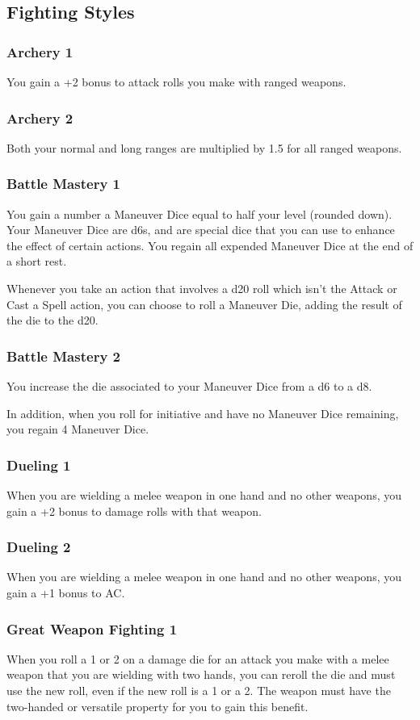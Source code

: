 \subsection*{Fighting Styles} \label{ssec::fightingstyles}
    \subsubsection{Archery 1}
        You gain a +2 bonus to attack rolls you make with ranged weapons.
    \subsubsection{Archery 2}
        Both your normal and long ranges are multiplied by 1.5 for all ranged weapons.
    \subsubsection{Battle Mastery 1}
        You gain a number a Maneuver Dice equal to half your level (rounded down).
        Your Maneuver Dice are d6s, and are special dice that you can use to enhance the effect of certain actions.
        You regain all expended Maneuver Dice at the end of a short rest.

        Whenever you take an action that involves a d20 roll which isn't the Attack or Cast a Spell action, you can choose to roll a Maneuver Die, adding the result of the die to the d20.
    \subsubsection{Battle Mastery 2}
        You increase the die associated to your Maneuver Dice from a d6 to a d8.

        In addition, when you roll for initiative and have no Maneuver Dice remaining, you regain 4 Maneuver Dice.
    \subsubsection{Dueling 1}
        When you are wielding a melee weapon in one hand and no other weapons, you gain a +2 bonus to damage rolls with that weapon.
    \subsubsection{Dueling 2}
        When you are wielding a melee weapon in one hand and no other weapons, you gain a +1 bonus to AC.
    \subsubsection{Great Weapon Fighting 1}
        When you roll a 1 or 2 on a damage die for an attack you make with a melee weapon that you are wielding with two hands, you can reroll the die and must use the new roll, even if the new roll is a 1 or a 2.
        The weapon must have the two-handed or versatile property for you to gain this benefit.
